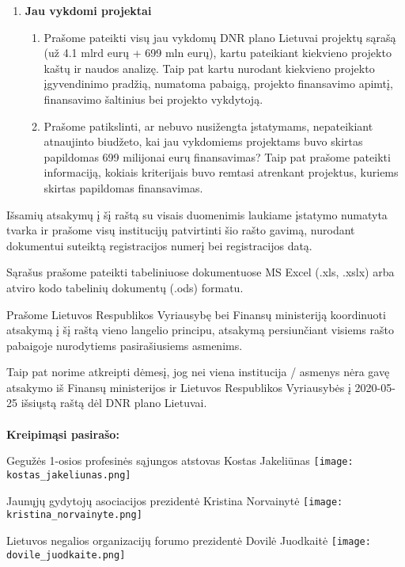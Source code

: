 \documentclass[12pt]{letter}
\begin{document}
\begin{enumerate}
\newpage 
\item \textbf{Jau vykdomi projektai}
\begin{enumerate}[resume]
\item Prašome pateikti visų jau vykdomų DNR plano Lietuvai projektų sąrašą (už 4.1 mlrd eurų + 699 mln eurų), kartu pateikiant kiekvieno projekto kaštų ir naudos analizę. Taip pat kartu nurodant kiekvieno projekto įgyvendinimo pradžią, numatoma pabaigą, projekto finansavimo apimtį, finansavimo šaltinius bei projekto vykdytoją.

\item Prašome patikslinti, ar nebuvo nusižengta įstatymams, nepateikiant atnaujinto biudžeto, kai jau vykdomiems projektams buvo skirtas papildomas 699 milijonai eurų finansavimas? Taip pat prašome pateikti informaciją, kokiais kriterijais buvo remtasi atrenkant projektus, kuriems skirtas papildomas finansavimas.

\end{enumerate}
\end{enumerate}



Išsamių atsakymų į šį raštą su visais duomenimis laukiame įstatymo numatyta tvarka ir prašome visų institucijų patvirtinti šio rašto gavimą, nurodant dokumentui suteiktą registracijos numerį bei registracijos datą. 

Sąrašus prašome pateikti tabeliniuose dokumentuose MS Excel (.xls, .xslx) arba atviro kodo tabelinių dokumentų (.ods) formatu.

Prašome Lietuvos Respublikos Vyriausybę bei Finansų ministeriją koordinuoti atsakymą į šį raštą vieno langelio principu, atsakymą persiunčiant visiems rašto pabaigoje nurodytiems pasirašiusiems asmenims. 

Taip pat norime atkreipti dėmesį, jog nei viena institucija / asmenys nėra gavę atsakymo iš Finansų ministerijos ir Lietuvos Respublikos Vyriausybės į 2020-05-25 išsiųstą  raštą dėl DNR plano Lietuvai.
\\
\\

\textbf{Kreipimąsi pasirašo:}

Gegužės 1-osios profesinės sąjungos atstovas Kostas Jakeliūnas
\texttt{[image: kostas\_jakeliunas.png]}

Jaunųjų gydytojų asociacijos prezidentė Kristina Norvainytė                        
\texttt{[image: kristina\_norvainyte.png]}

Lietuvos negalios organizacijų forumo prezidentė Dovilė Juodkaitė
\texttt{[image: dovile\_juodkaite.png]}
\end{document}
